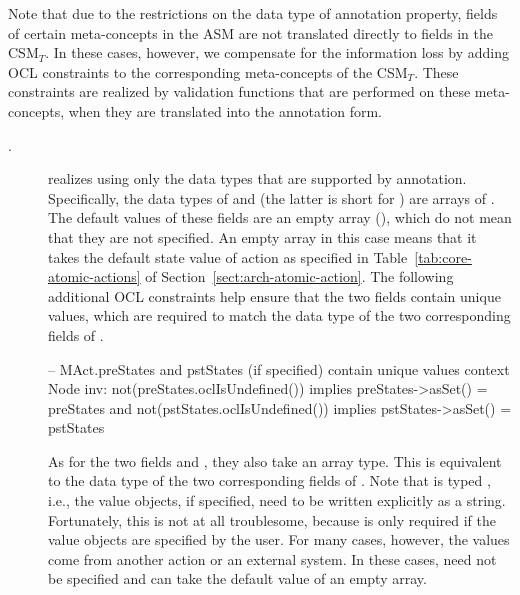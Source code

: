 Note that due to the restrictions on the data type of annotation property, fields of certain meta-concepts in the ASM are not translated directly to fields in the CSM$_T$. In these cases, however, we compensate for the information loss by adding OCL constraints to the corresponding meta-concepts of the CSM$_T$. These constraints are realized by validation functions that are performed on these meta-concepts, when they are translated into the annotation form.
%
\begin{description}
	\item[.]  realizes  using only the data types that are supported by annotation. Specifically, the data types of  and  (the latter is short for ) are arrays of . The default values of these fields are an empty array (\code{[]}), which do not mean that they are not specified. An empty array in this case means that it takes the default state value of action as specified in Table~\ref{tab:core-atomic-actions} of Section~\ref{sect:arch-atomic-action}.
	The following additional OCL constraints help ensure that the two fields contain unique values, which are required to match the  data type of the two corresponding fields of .
	\begin{lstrule}
		-- MAct.preStates and pstStates (if specified) contain unique values
		context Node inv:
		not(preStates.oclIsUndefined()) implies preStates->asSet() = preStates and 
		not(pstStates.oclIsUndefined()) implies pstStates->asSet() = pstStates
	\end{lstrule}
	
	As for the two fields  and , they also take an array type. This is equivalent to the  data type of the two corresponding fields of . Note that  is typed , i.e., the value objects, if specified, need to be written explicitly as a string. Fortunately, this is not at all troublesome, because  is only required if the value objects are specified by the user. For many cases, however, the values come from another action or an external system. In these cases,  need not be specified and can take the default value of an empty array.
	

\end{description}
